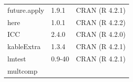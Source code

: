 \documentclass[
  12pt,
]{book}
\theoremstyle{definition}
\theoremstyle{definition}
\theoremstyle{definition}
\theoremstyle{remark}
\begin{document}
\begin{longtable}[]{@{}lll@{}}
\begin{minipage}[t]{0.14\columnwidth}\raggedright
future.apply\strut
\end{minipage} & \begin{minipage}[t]{0.08\columnwidth}\raggedright
1.9.1\strut
\end{minipage} & \begin{minipage}[t]{0.69\columnwidth}\raggedright
CRAN (R 4.2.1)\strut
\end{minipage}\tabularnewline
\begin{minipage}[t]{0.14\columnwidth}\raggedright
here\strut
\end{minipage} & \begin{minipage}[t]{0.08\columnwidth}\raggedright
1.0.1\strut
\end{minipage} & \begin{minipage}[t]{0.69\columnwidth}\raggedright
CRAN (R 4.2.2)\strut
\end{minipage}\tabularnewline
\begin{minipage}[t]{0.14\columnwidth}\raggedright
ICC\strut
\end{minipage} & \begin{minipage}[t]{0.08\columnwidth}\raggedright
2.4.0\strut
\end{minipage} & \begin{minipage}[t]{0.69\columnwidth}\raggedright
CRAN (R 4.2.0)\strut
\end{minipage}\tabularnewline
\begin{minipage}[t]{0.14\columnwidth}\raggedright
kableExtra\strut
\end{minipage} & \begin{minipage}[t]{0.08\columnwidth}\raggedright
1.3.4\strut
\end{minipage} & \begin{minipage}[t]{0.69\columnwidth}\raggedright
CRAN (R 4.2.1)\strut
\end{minipage}\tabularnewline
\begin{minipage}[t]{0.14\columnwidth}\raggedright
lmtest\strut
\end{minipage} & \begin{minipage}[t]{0.08\columnwidth}\raggedright
0.9-40\strut
\end{minipage} & \begin{minipage}[t]{0.69\columnwidth}\raggedright
CRAN (R 4.2.1)\strut
\end{minipage}\tabularnewline
\begin{minipage}[t]{0.14\columnwidth}\raggedright
multcomp\strut

\end{minipage}
\end{longtable}
\end{document}
